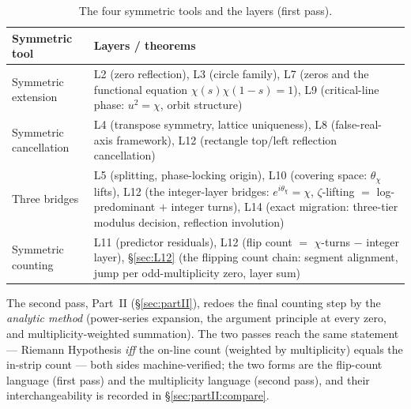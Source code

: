 \documentclass{article}
\newcommand{\zt}{\zeta}
\newcommand{\Xchi}{\chi}
\begin{document}
\begin{table}[h]
\centering
\caption{The four symmetric tools and the layers (first pass).}
\label{tab:symtools}
{\small
\begin{tabular}{@{}p{3.8cm}p{11.4cm}@{}}
\hline
Symmetric tool & Layers / theorems \\
\hline
Symmetric extension & L2 (zero reflection), L3 (circle family), L7 (zeros and the
functional equation $\Xchi(s)\Xchi(1-s)=1$), L9 (critical-line phase:
$u^2=\Xchi$, orbit structure) \\
Symmetric cancellation & L4 (transpose symmetry, lattice uniqueness), L8
(false-real-axis framework), L12 (rectangle top/left reflection
cancellation) \\
Three bridges & L5 (splitting, phase-locking origin), L10 (covering space:
$\theta_\Xchi$ lifts), L12 (the integer-layer bridges:
$e^{i\theta_\Xchi}=\Xchi$, $\zt$-lifting $=$ log-predominant
$+$ integer turns), L14 (exact migration: three-tier modulus decision,
reflection involution) \\
Symmetric counting & L11 (predictor residuals), L12 (flip count $=$
$\Xchi$-turns $-$ integer layer), \S\ref{sec:L12} (the flipping count
chain: segment alignment, jump per odd-multiplicity zero, layer sum) \\
\hline
\end{tabular}
}
\end{table}

The second pass, Part~II (\S\ref{sec:partII}), redoes the final counting
step by the \emph{analytic method} (power-series expansion, the argument
principle at every zero, and multiplicity-weighted summation). The two
passes reach the same statement --- Riemann Hypothesis \emph{iff} the
on-line count (weighted by multiplicity) equals the in-strip count ---
both sides machine-verified; the two forms are the flip-count language
(first pass) and the multiplicity language (second pass), and their
interchangeability is recorded in \S\ref{sec:partII:compare}.
\end{document}
